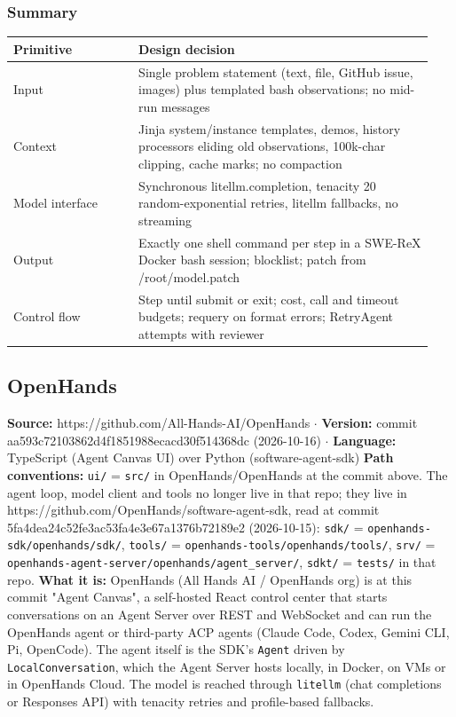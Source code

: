 \subsubsection*{Summary}
\begin{longtable}{@{}p{0.28\linewidth}p{0.66\linewidth}@{}}
\toprule \textbf{Primitive} & \textbf{Design decision} \\ \midrule \endhead
Input & Single problem statement (text, file, GitHub issue, images) plus templated bash observations; no mid-run messages \\
Context & Jinja system/instance templates, demos, history processors eliding old observations, 100k-char clipping, cache marks; no compaction \\
Model interface & Synchronous litellm.completion, tenacity 20 random-exponential retries, litellm fallbacks, no streaming \\
Output & Exactly one shell command per step in a SWE-ReX Docker bash session; blocklist; patch from /root/model.patch \\
Control flow & Step until submit or exit; cost, call and timeout budgets; requery on format errors; RetryAgent attempts with reviewer \\
\bottomrule \end{longtable}


\subsection{OpenHands}

\textbf{Source:} https://github.com/All-Hands-AI/OpenHands $\cdot$ \textbf{Version:} commit aa593c72103862d4f1851988ecacd30f514368dc (2026-10-16) $\cdot$ \textbf{Language:} TypeScript (Agent Canvas UI) over Python (software-agent-sdk)
\textbf{Path conventions:} \texttt{ui/\allowbreak{}} = \texttt{src/\allowbreak{}} in OpenHands/OpenHands at the commit above. The agent loop, model client and tools no longer live in that repo; they live in https://github.com/OpenHands/software-agent-sdk, read at commit 5fa4dea24c52fe3ac53fa4e3e67a1376b72189e2 (2026-10-15): \texttt{sdk/\allowbreak{}} = \texttt{openhands-\allowbreak{}sdk/\allowbreak{}openhands/\allowbreak{}sdk/\allowbreak{}}, \texttt{tools/\allowbreak{}} = \texttt{openhands-\allowbreak{}tools/\allowbreak{}openhands/\allowbreak{}tools/\allowbreak{}}, \texttt{srv/\allowbreak{}} = \texttt{openhands-\allowbreak{}agent-\allowbreak{}server/\allowbreak{}openhands/\allowbreak{}agent\_\allowbreak{}server/\allowbreak{}}, \texttt{sdkt/\allowbreak{}} = \texttt{tests/\allowbreak{}} in that repo.
\textbf{What it is:} OpenHands (All Hands AI / OpenHands org) is at this commit "Agent Canvas", a self-hosted React control center that starts conversations on an Agent Server over REST and WebSocket and can run the OpenHands agent or third-party ACP agents (Claude Code, Codex, Gemini CLI, Pi, OpenCode). The agent itself is the SDK's \texttt{Agent} driven by \texttt{LocalConversation}, which the Agent Server hosts locally, in Docker, on VMs or in OpenHands Cloud. The model is reached through \texttt{litellm} (chat completions or Responses API) with tenacity retries and profile-based fallbacks.

